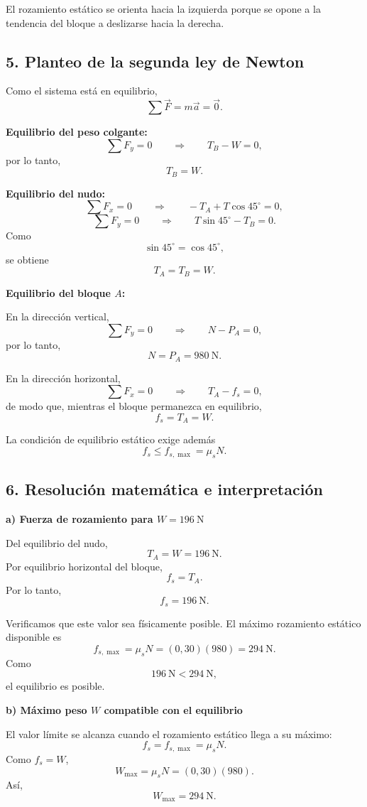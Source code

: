 \documentclass[12pt]{article}
\newcounter{ejercicio}
\newcommand{\paso}[2]{%
  \subsection*{\color{AzulFisica}#1. #2}%
}
\begin{document}
El rozamiento estático se orienta hacia la izquierda porque se opone a la tendencia del bloque a deslizarse hacia la derecha.

\paso{5}{Planteo de la segunda ley de Newton}
Como el sistema está en equilibrio,
\[
\sum\vec F=m\vec a=\vec 0.
\]

\textbf{Equilibrio del peso colgante:}
\[
\sum F_y=0
\qquad\Rightarrow\qquad
T_B-W=0,
\]
por lo tanto,
\[
\boxed{T_B=W}.
\]

\textbf{Equilibrio del nudo:}
\[
\sum F_x=0
\qquad\Rightarrow\qquad
-T_A+T\cos45^\circ=0,
\]
\[
\sum F_y=0
\qquad\Rightarrow\qquad
T\sin45^\circ-T_B=0.
\]
Como
\[
\sin45^\circ=\cos45^\circ,
\]
se obtiene
\[
\boxed{T_A=T_B=W}.
\]

\textbf{Equilibrio del bloque $A$:}

En la dirección vertical,
\[
\sum F_y=0
\qquad\Rightarrow\qquad
N-P_A=0,
\]
por lo tanto,
\[
\boxed{N=P_A=\SI{980}{\newton}}.
\]

En la dirección horizontal,
\[
\sum F_x=0
\qquad\Rightarrow\qquad
T_A-f_s=0,
\]
de modo que, mientras el bloque permanezca en equilibrio,
\[
\boxed{f_s=T_A=W}.
\]

La condición de equilibrio estático exige además
\[
f_s\leq f_{s,\max}=\mu_sN.
\]

\paso{6}{Resolución matemática e interpretación}

\textbf{a) Fuerza de rozamiento para $W=\SI{196}{\newton}$}

Del equilibrio del nudo,
\[
T_A=W=\SI{196}{\newton}.
\]
Por equilibrio horizontal del bloque,
\[
f_s=T_A.
\]
Por lo tanto,
\[
\boxed{f_s=\SI{196}{\newton}}.
\]

Verificamos que este valor sea físicamente posible. El máximo rozamiento estático disponible es
\[
f_{s,\max}=\mu_sN=(0,30)(980)=\SI{294}{\newton}.
\]
Como
\[
\SI{196}{\newton}<\SI{294}{\newton},
\]
el equilibrio es posible.

\textbf{b) Máximo peso $W$ compatible con el equilibrio}

El valor límite se alcanza cuando el rozamiento estático llega a su máximo:
\[
f_s=f_{s,\max}=\mu_sN.
\]
Como $f_s=W$,
\[
W_{\max}=\mu_sN=(0,30)(980).
\]
Así,
\[
\boxed{W_{\max}=\SI{294}{\newton}}.
\]

\vspace{0.5em}
\begin{center}
\end{center}
\end{document}

